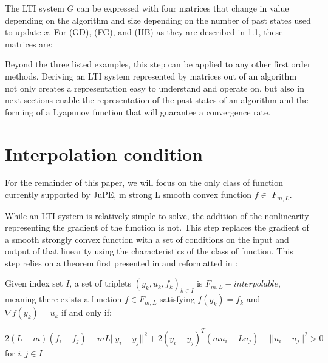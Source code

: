 The LTI system \(G\) can be expressed with four matrices that change in value depending on the algorithm and size depending on the number of past states used to update \(x\). For (GD), (FG), and (HB) as they are described in 1.1, these matrices are:

Beyond the three listed examples, this step can be applied to any other first order methods. Deriving an LTI system represented by matrices out of an algorithm not only creates a representation easy to understand and operate on, but also in next sections enable the representation of the past states of an algorithm and the forming of a Lyapunov function that will guarantee a convergence rate.

\section{Interpolation condition}

For the remainder of this paper, we will focus on the only class of function currently supported by JuPE, m strong L smooth convex function \(f \in \) \(F_{m,L}\).

While an LTI system is relatively simple to solve, the addition of the nonlinearity representing the gradient of the function is not. This step replaces the gradient of a smooth strongly convex function with a set of conditions on the input and output of that linearity using the characteristics of the class of function. This step relies on a theorem first presented in \cite{taylor2016} and reformatted in \cite{tutorial}:

\begin{theorem}
	\label{thm:interpolation_condition}
	Given index set \(I\), a set of triplets \({(y_k, u_k, f_k)}_{k \in I}\) is \(F_{m,L}-interpolable\), meaning there exists a function \(f \in F_{m,L}\) satisfying \(f(y_k) = f_k\) and \(\nabla f(y_k) = u_k\) if and only if:

	\(2(L-m)(f_i - f_j) - mL||y_i - y_j||^2 + 2(y_i - y_j)^{T}(mu_i - Lu_j) - ||u_i - u_j||^2 > 0\) for \(i ,j \in I\)
\end{theorem}

